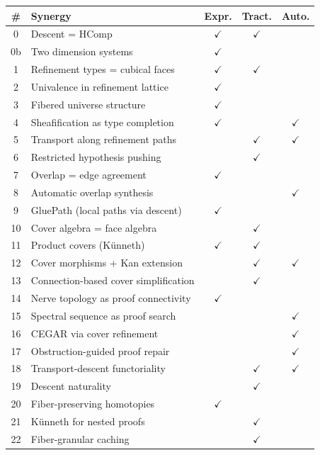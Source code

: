 \documentclass[11pt,a4paper]{article}
\theoremstyle{definition}
\theoremstyle{plain}
\begin{document}
\begin{longtable}{clccc}
\toprule
\textbf{\#} & \textbf{Synergy} & \textbf{Expr.} & \textbf{Tract.} &
  \textbf{Auto.} \\
\midrule
\endhead
0  & Descent = HComp & $\checkmark$ & $\checkmark$ & \\
0b & Two dimension systems & $\checkmark$ & & \\
1  & Refinement types = cubical faces & $\checkmark$ & $\checkmark$ & \\
2  & Univalence in refinement lattice & $\checkmark$ & & \\
3  & Fibered universe structure & $\checkmark$ & & \\
4  & Sheafification as type completion & $\checkmark$ & & $\checkmark$ \\
5  & Transport along refinement paths & & $\checkmark$ & $\checkmark$ \\
6  & Restricted hypothesis pushing & & $\checkmark$ & \\
7  & Overlap = edge agreement & $\checkmark$ & & \\
8  & Automatic overlap synthesis & & & $\checkmark$ \\
9  & GluePath (local paths via descent) & $\checkmark$ & & \\
10 & Cover algebra = face algebra & & $\checkmark$ & \\
11 & Product covers (K\"unneth) & $\checkmark$ & $\checkmark$ & \\
12 & Cover morphisms + Kan extension & & $\checkmark$ & $\checkmark$ \\
13 & Connection-based cover simplification & & $\checkmark$ & \\
14 & Nerve topology as proof connectivity & $\checkmark$ & & \\
15 & Spectral sequence as proof search & & & $\checkmark$ \\
16 & CEGAR via cover refinement & & & $\checkmark$ \\
17 & Obstruction-guided proof repair & & & $\checkmark$ \\
18 & Transport-descent functoriality & & $\checkmark$ & $\checkmark$ \\
19 & Descent naturality & & $\checkmark$ & \\
20 & Fiber-preserving homotopies & $\checkmark$ & & \\
21 & K\"unneth for nested proofs & & $\checkmark$ & \\
22 & Fiber-granular caching & & $\checkmark$ & \\

\end{longtable}
\end{document}
